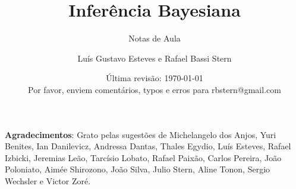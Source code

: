 \documentclass[11pt]{scrartcl}
\title{Inferência Bayesiana \\[8mm]}
\subtitle{Notas de Aula \\[8mm]}
\author{Luís Gustavo Esteves e Rafael Bassi Stern}
\date{Última revisão: \today \\[8mm]
Por favor, enviem comentários, typos e erros para rbstern@gmail.com}
\begin{document}
\maketitle

\vspace{20mm}

\textbf{Agradecimentos}: Grato pelas sugestões de
Michelangelo dos Anjos, Yuri Benites, Ian Danilevicz, Andressa Dantas, Thales Egydio, Luís Esteves, Rafael Izbicki, Jeremias Leão, Tarcísio Lobato, Rafael Paixão, Carlos Pereira, João Poloniato,  Aimée Shirozono, João Silva, Julio Stern, Aline Tonon, Sergio Wechsler e Victor Zoré.

\newpage
 
\tableofcontents
  
\newpage






















\end{document}

